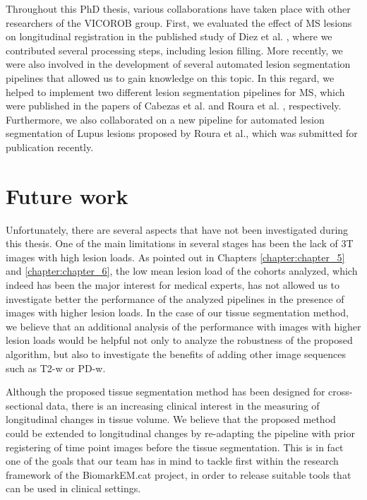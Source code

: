 \begin{itemize}
\end{itemize}

Throughout this PhD thesis, various collaborations have taken place with other researchers of the VICOROB group. First, we evaluated the effect of MS lesions on longitudinal registration in the published study of Diez et al. \cite{Diez2014}, where we contributed several processing steps, including lesion filling. More recently, we were also involved in the development of several automated lesion segmentation pipelines that allowed us to gain knowledge on this topic. In this regard, we helped to implement two different lesion segmentation pipelines for MS, which were published in the papers of Cabezas et al. \cite{Cabezas2014b} and Roura et al. \cite{Roura2015}, respectively. Furthermore, we also collaborated on a new pipeline for automated lesion segmentation of Lupus lesions proposed by Roura et al., which was submitted for publication recently. 

\section{Future work}

Unfortunately, there are several aspects that have not been investigated during this thesis. One of the main limitations in several stages has been the lack of 3T images with high lesion loads. As pointed out in Chapters \ref{chapter:chapter_5} and \ref{chapter:chapter_6}, the low mean lesion load of the cohorts analyzed, which indeed has been the major interest for medical experts, has not allowed us to investigate better the performance of the analyzed pipelines in the presence of images with higher lesion loads. In the case of our tissue segmentation method, we believe that an additional analysis of the performance with images with higher lesion loads would be helpful not only to analyze the robustness of the proposed algorithm, but also to investigate the benefits of adding other image sequences such as T2-w or PD-w. 

Although the proposed tissue segmentation method has been designed for cross-sectional data, there is an increasing clinical interest in the measuring of longitudinal changes in tissue volume. We believe that the proposed method could be extended to longitudinal changes by re-adapting the pipeline with prior registering of time point images before the tissue segmentation. This is in fact one of the goals that our team has in mind to tackle first within the research framework of the BiomarkEM.cat project, in order to release suitable tools that can be used in clinical settings. 

